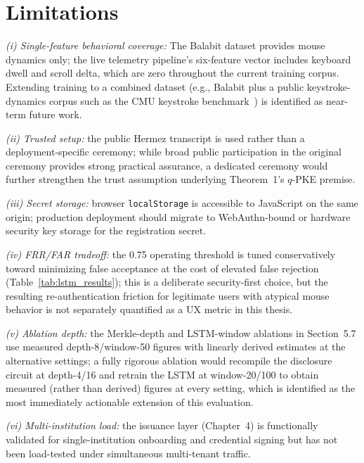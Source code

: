 \documentclass[12pt,a4paper,oneside]{report}
\begin{document}
\section{Limitations}

\textit{(i) Single-feature behavioral coverage:} The Balabit dataset
provides mouse dynamics only; the live telemetry pipeline's six-feature
vector includes keyboard dwell and scroll delta, which are zero
throughout the current training corpus. Extending training to a combined
dataset (e.g., Balabit plus a public keystroke-dynamics corpus such as
the CMU keystroke benchmark~\cite{killourhy09}) is identified as
near-term future work.

\textit{(ii) Trusted setup:} the public Hermez transcript is used rather
than a deployment-specific ceremony; while broad public participation in
the original ceremony provides strong practical assurance, a dedicated
ceremony would further strengthen the trust assumption underlying
Theorem~1's $q$-PKE premise.

\textit{(iii) Secret storage:} browser \texttt{localStorage} is
accessible to JavaScript on the same origin; production deployment should
migrate to WebAuthn-bound or hardware security key storage for the
registration secret.

\textit{(iv) FRR/FAR tradeoff:} the 0.75 operating threshold is tuned
conservatively toward minimizing false acceptance at the cost of elevated
false rejection (Table~\ref{tab:lstm_results}); this is a deliberate
security-first choice, but the resulting re-authentication friction for
legitimate users with atypical mouse behavior is not separately quantified
as a UX metric in this thesis.

\textit{(v) Ablation depth:} the Merkle-depth and LSTM-window ablations
in Section~5.7 use measured depth-8/window-50 figures with linearly
derived estimates at the alternative settings; a fully rigorous ablation
would recompile the disclosure circuit at depth-4/16 and retrain the LSTM
at window-20/100 to obtain measured (rather than derived) figures at
every setting, which is identified as the most immediately actionable
extension of this evaluation.

\textit{(vi) Multi-institution load:} the issuance layer (Chapter~4) is
functionally validated for single-institution onboarding and credential
signing but has not been load-tested under simultaneous multi-tenant
traffic.
\end{document}
